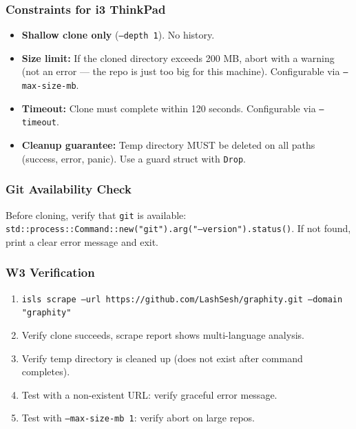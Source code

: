 \documentclass[11pt,a4paper]{article}
\begin{document}
\subsubsection{Constraints for i3 ThinkPad}

\begin{itemize}[nosep]
\item \textbf{Shallow clone only} (\texttt{--depth 1}). No history.
\item \textbf{Size limit:} If the cloned directory exceeds 200 MB,
      abort with a warning (not an error --- the repo is just too big
      for this machine). Configurable via \texttt{--max-size-mb}.
\item \textbf{Timeout:} Clone must complete within 120 seconds.
      Configurable via \texttt{--timeout}.
\item \textbf{Cleanup guarantee:} Temp directory MUST be deleted on all
      paths (success, error, panic). Use a guard struct with \texttt{Drop}.
\end{itemize}

\subsubsection{Git Availability Check}

Before cloning, verify that \texttt{git} is available:
\texttt{std::process::Command::new("git").arg("--version").status()}.
If not found, print a clear error message and exit.

\subsubsection{W3 Verification}

\begin{enumerate}[nosep]
\item \texttt{isls scrape --url https://github.com/LashSesh/graphity.git
      --domain "graphity"}
\item Verify clone succeeds, scrape report shows multi-language analysis.
\item Verify temp directory is cleaned up (does not exist after command
      completes).
\item Test with a non-existent URL: verify graceful error message.
\item Test with \texttt{--max-size-mb 1}: verify abort on large repos.
\end{enumerate}


\end{document}
